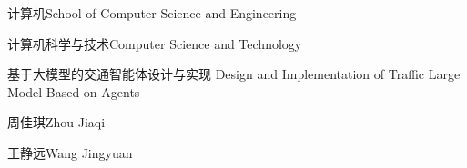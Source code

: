 
\school
{计算机}{School of Computer Science and Engineering}

\major
{计算机科学与技术}{Computer Science and Technology}

\thesistitle
{基于大模型的交通智能体设计与实现}
{}
{Design and Implementation of Traffic Large Model Based on Agents}
{}

\thesisauthor
{周佳琪}{Zhou Jiaqi}

\teacher
{王静远}{Wang Jingyuan}






